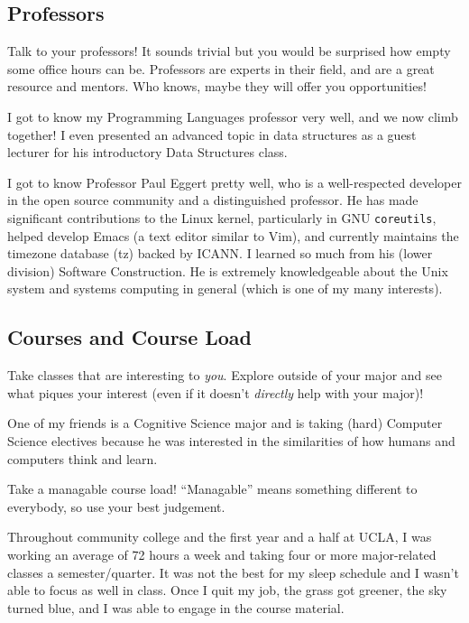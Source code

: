 \documentclass[12pt]{article}
\newenvironment{example}{
\begin{tcolorbox}[title=Example, colback=blue!5!white, colframe=black!75!blue]
}{ \end{tcolorbox} }
\renewcommand{\it}[1]{\textit{{#1}}}
\begin{document}
\subsection{Professors}
Talk to your professors! It sounds trivial but you would be surprised how empty
some office hours can be. Professors are experts in their field, and are a great
resource and mentors. Who knows, maybe they will offer you opportunities!
\begin{example}
  I got to know my Programming Languages professor very well, and we now climb
  together! I even presented an advanced topic in data structures as a guest
  lecturer for his introductory Data Structures class.
\end{example}

\begin{example}
  I got to know Professor Paul Eggert pretty well, who is a well-respected
  developer in the open source community and a distinguished professor. He has
  made significant contributions to the Linux kernel, particularly in GNU
  \texttt{coreutils}, helped develop Emacs (a text editor similar to Vim), and
  currently maintains the timezone database (tz) backed by ICANN. I learned so
  much from his (lower division) Software Construction. He is extremely
  knowledgeable about the Unix system and systems computing in general (which is
  one of my many interests).
\end{example}

\subsection{Courses and Course Load}
Take classes that are interesting to \it{you}. Explore outside of your major and
see what piques your interest (even if it doesn't \it{directly} help with your
major)!
\begin{example}
  One of my friends is a Cognitive Science major and is taking (hard) Computer
  Science electives because he was interested in the similarities of
  how humans and computers think and learn.
\end{example}

Take a managable course load! ``Managable'' means something different to
everybody, so use your best judgement.
\begin{example}
  Throughout community college and the first year and a half at UCLA, I was
  working an average of 72 hours a week and taking four or more major-related
  classes a semester/quarter. It was not the best for my sleep schedule and I
  wasn't able to focus as well in class. Once I quit my job, the grass got
  greener, the sky turned blue, and I was able to engage in the course material.
\end{example}
\end{document}
